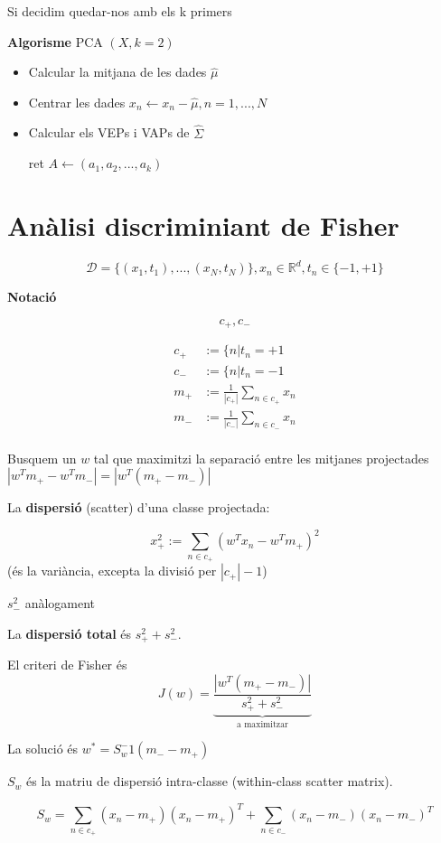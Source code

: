 \documentclass[a4paper]{article}
\begin{document}
	Si decidim quedar-nos amb els k primers 
	
	
	\textbf{Algorisme} PCA $(X, k = 2)$
	
	\begin{itemize}
		\item Calcular la mitjana de les dades $\hat{\mu}$
		\item Centrar les dades $x_n \leftarrow x_n - \hat{\mu}, n = 1, ..., N$
		\item Calcular els VEPs i VAPs de $\hat{\Sigma}$
		
		ret $A \leftarrow (a_1, a_2, ..., a_k)$
	\end{itemize}
	
	\section{Anàlisi discriminiant de Fisher}
	\[ \mathcal{D} = \{(x_1, t_1), ..., (x_N, t_N)\}, x_n \in \mathbb{R}^d, t_n \in \{-1, +1 \} \]
	
	
	\textbf{Notació}
	
	\[ c_+, c_- \]
	
	\begin{equation}
		\begin{align*}
			c_+ &:= \{ n | t_n = +1 \\
			c_- &:= \{ n | t_n = -1 \\
			m_+ &:= \frac{1}{|c_+|} \sum_{n\in c_+} x_n \\
			m_- &:= \frac{1}{|c_-|} \sum_{n\in c_-} x_n \\
		\end{align*}
	\end{equation}
	
	Busquem un $w$ tal que maximitzi la separació entre les mitjanes projectades $|w^Tm_+ - w^Tm_-| = |w^T(m_+ - m_-)|$
	
	La \textbf{dispersió} (scatter) d'una classe projectada:
	
	\[ x_+^2 := \sum_{n \in c_+} (w^Tx_n - w^Tm_+)^2 \]
	(és la variància, excepta la divisió per $|c_+| - 1$)

	$s_-^2$ anàlogament
	
	La \textbf{dispersió total} és $s_+^2 + s_-^2$.
	
	El criteri de Fisher és \[ J(w) = \underbrace{\frac{|w^T(m_+-m_-)|}{s_+^2 + s_-^2}}_\text{a maximitzar} \]
	
	La solució és $w^* = S_w^-1(m_- - m_+)$
	
	$S_w$ és la matriu de dispersió intra-classe (within-class scatter matrix).
	
	\[ S_w = \sum_{n \in c_+} (x_n - m_+)(x_n - m_+)^T + \sum_{n \in c_-} (x_n - m_-)(x_n - m_-)^T \]
	
\end{document}
